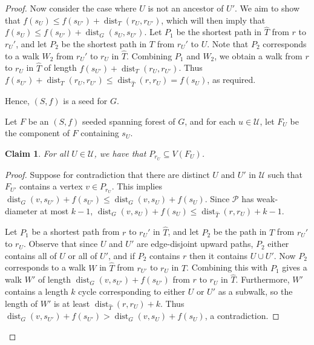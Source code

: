 \documentclass[11pt]{article}
\renewcommand{\geq}{\geqslant}
\renewcommand{\leq}{\leqslant}
\DeclareMathOperator{\dist}{dist}
\theoremstyle{plain}
\newtheorem{claim}{Claim}[thm]
\theoremstyle{definition}
\newcommand{\PP}{\mathcal{P}}
\begin{document}
\begin{proof}
			Now consider the case where $U$ is not an ancestor of $U'$.
			We aim to show that $f(s_U)\leq f(s_{U'})+\dist_T(r_U,r_{U'})$, which will then imply that $f(s_U)\leq f(s_{U'})+\dist_G(s_U,s_{U'})$.
			Let $P_1$ be the shortest path in $\hat{T}$ from $r$ to $r_U'$, and let $P_2$ be the shortest path in $T$ from $r_U'$ to $U$. 
			Note that $P_2$ corresponds to a walk $W_2$ from $r_U'$ to $r_U$ in $\hat{T}$. Combining $P_1$ and $W_2$, we obtain a walk from $r$ to $r_U$ in $\hat{T}$ of length $f(s_{U'})+\dist_T(r_U,r_{U'})$. Thus $f(s_{U'})+\dist_T(r_U,r_{U'})\leq \dist_{\hat{T}}(r,r_U)=f(s_U)$, as required.
			
			
			Hence, $(S,f)$ is a seed for $G$.
			
			Let $F$ be an $(S,f)$ seeded spanning forest of $G$, and for each $u\in \mathcal{U}$, let $F_U$ be the component of $F$ containing $s_U$. 
			
			\begin{claim}\label{clm:rootparts}
				For all $U\in \mathcal{U}$, we have that $P_{r_U}\subseteq V(F_U)$. 
			\end{claim}
			\begin{proof}
				Suppose for contradiction that there are distinct $U$ and $U'$ in $\mathcal{U}$ such that $F_{U'}$ contains a vertex $v\in P_{r_U}$.
				This implies $\dist_G(v,s_{U'})+f(s_{U'})\leq \dist_G(v,s_{U})+f(s_{U})$.
				Since $\PP$ has weak-diameter at most $k-1$, $\dist_G(v,s_{U})+f(s_{U})\leq \dist_{\hat{T}}(r,r_{U})+k-1$.
				
				Let $P_1$ be a shortest path from $r$ to $r_U'$ in $\hat{T}$, and let $P_2$ be the path in $T$ from $r_U'$ to $r_U$.
				Observe that since $U$ and $U'$ are edge-disjoint upward paths, $P_2$ either contains all of $U$ or all of $U'$, and if $P_2$ contains $r$ then it contains $U\cup U'$. Now $P_2$ corresponds to a walk $W$ in $\hat{T}$ from $r_{U'}$ to $r_U$ in $\hat{T}$.
				Combining this with $P_1$ gives a walk $W'$ of length  $\dist_G(v,s_{U'})+f(s_{U'})$ from $r$ to $r_U$ in $\hat{T}$. Furthermore, $W'$ contains a length $k$ cycle corresponding to either $U$ or $U'$ as a subwalk, so the length of $W'$ is at least $\dist_{\hat{T}}(r,r_U)+k$. Thus $\dist_G(v,s_{U'})+f(s_{U'})>\dist_G(v,s_{U})+f(s_{U})$, a contradiction.
				

\end{proof}
\end{proof}
\end{document}
